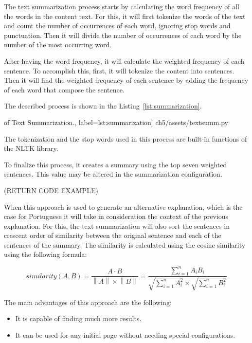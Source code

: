 The text summarization process starts by calculating the word frequency of all the words in the content text.
For this, it will first tokenize the words of the text and count the number of occurrences of each word, ignoring stop words and punctuation.
Then it will divide the number of occurrences of each word by the number of the most occurring word.

After having the word frequency, it will calculate the weighted frequency of each sentence.
To accomplish this, first, it will tokenize the content into sentences.
Then it will find the weighted frequency of each sentence by adding the frequency of each word that compose the sentence.

The described process is shown in the Listing~\ref{lst:summarization}.

\begin{center}
\begin{minipage}{0.95\linewidth}
 of Text Summarization.,
label=lst:summarization]
{ch5/assets/textsumm.py}
\end{minipage}
\end{center}

The tokenization and the stop words used in this process are built-in functions of the NLTK library.

To finalize this process, it creates a summary using the top seven weighted sentences.
This value may be altered in the summarization configuration.

(RETURN CODE EXAMPLE) %

When this approach is used to generate an alternative explanation, which is the case for Portuguese it will take in consideration the context of the previous explanation.
For this, the text summarization will also sort the sentences in crescent order of similarity between the original sentence and each of the sentences of the summary.
The similarity is calculated using the cosine similarity using the following formula:

\begin{equation}
    {similarity(A,B)} = \frac{A \cdot B}{\left \| A \right \| \times \left \| B \right \|}= \frac{\sum_{i=1}^{n} A_{i}B_{i}}{\sqrt{\sum_{i=1}^{n} A_{i}^{2}} \times \sqrt{\sum_{i=1}^{n} B_{i}^{2}}}
\label{similarity}
\end{equation}

The main advantages of this approach are the following:
\begin{itemize}
        \item It is capable of finding much more results.
        \item It can be used for any initial page without needing special configurations.
\end{itemize}

